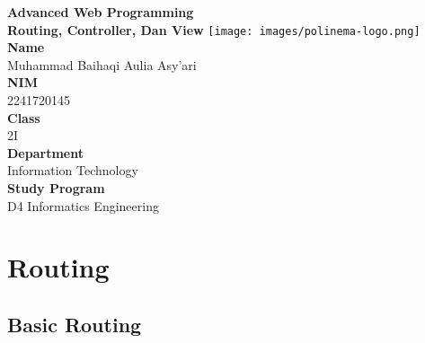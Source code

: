 \documentclass[12pt,titlepage]{article}
\newcommand{\vSubject}{Advanced Web Programming}
\newcommand{\vSubtitle}{Routing, Controller, Dan View}
\newcommand{\vName}{Muhammad Baihaqi Aulia Asy'ari}
\newcommand{\vNIM}{2241720145}
\newcommand{\vClass}{2I}
\newcommand{\vDepartment}{Information Technology}
\newcommand{\vStudyProgram}{D4 Informatics Engineering}
\begin{document}
\begin{titlepage}
    \centering
    \vfill
    {\bfseries\LARGE
        \vSubject\\
        \vskip0.25cm
        \vSubtitle
    }
    \vfill
    \texttt{[image: images/polinema-logo.png]}
    \vfill
    {
        \textbf{Name}\\
        \vName\\
        \vskip0.5cm
        \textbf{NIM}\\
        \vNIM\\
        \vskip0.5cm
        \textbf{Class}\\
        \vClass\\
        \vskip0.5cm
        \textbf{Department}\\
        \vDepartment\\
        \vskip0.5cm
        \textbf{Study Program}\\
        \vStudyProgram
    }
\end{titlepage}

\newpage

\section{Routing}
\subsection{Basic Routing}
\end{document}
